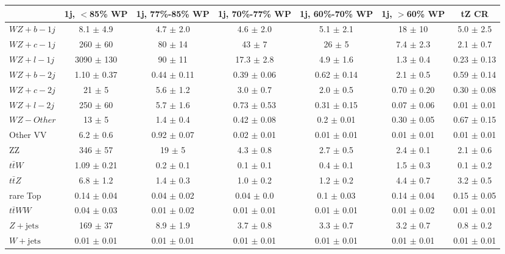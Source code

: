 \begin{tabular}{|l|c|c|c|c|c|c|}
\hline 
 & {1j, $<$85\% WP} & {1j, 77\%-85\% WP} & {1j, 70\%-77\% WP} & {1j, 60\%-70\% WP} & {1j, $>$60\% WP} & {tZ CR}\\
\hline 
  $WZ + b - 1j$   & 8.1 $\pm$ 4.9 & 4.7 $\pm$ 2.0 & 4.6 $\pm$ 2.0 & 5.1 $\pm$ 2.1 & 18 $\pm$ 10 & 5.0 $\pm$ 2.5 \\ 
  $WZ + c - 1j$   & 260 $\pm$ 60 & 80 $\pm$ 14 & 43 $\pm$ 7 & 26 $\pm$ 5 & 7.4 $\pm$ 2.3 & 2.1 $\pm$ 0.7 \\ 
  $WZ + l - 1j$   & 3090 $\pm$ 130 & 90 $\pm$ 11 & 17.3 $\pm$ 2.8 & 4.9 $\pm$ 1.6 & 1.3 $\pm$ 0.4 & 0.23 $\pm$ 0.13 \\ 
  $WZ + b - 2j$   & 1.10 $\pm$ 0.37 & 0.44 $\pm$ 0.11 & 0.39 $\pm$ 0.06 & 0.62 $\pm$ 0.14 & 2.1 $\pm$ 0.5 & 0.59 $\pm$ 0.14 \\
  $WZ + c - 2j$   & 21 $\pm$ 5 & 5.6 $\pm$ 1.2 & 3.0 $\pm$ 0.7 & 2.0 $\pm$ 0.5 & 0.70 $\pm$ 0.20 & 0.30 $\pm$ 0.08\\
  $WZ + l - 2j$   & 250 $\pm$ 60 & 5.7 $\pm$ 1.6 & 0.73 $\pm$ 0.53 & 0.31 $\pm$ 0.15 & 0.07 $\pm$ 0.06 & 0.01 $\pm$ 0.01 \\
  $WZ - Other$   & 13 $\pm$ 5 & 1.4 $\pm$ 0.4 & 0.42 $\pm$ 0.08 & 0.2 $\pm$ 0.01 & 0.30 $\pm$ 0.05 & 0.67 $\pm$ 0.15 \\
  Other VV   & 6.2 $\pm$ 0.6 & 0.92 $\pm$ 0.07 & 0.02 $\pm$ 0.01 & 0.01 $\pm$ 0.01 & 0.01 $\pm$ 0.01 & 0.01 $\pm$ 0.01 \\
  ZZ  & 346 $\pm$ 57 & 19 $\pm$ 5 & 4.3 $\pm$ 0.8 & 2.7 $\pm$ 0.5 & 2.4 $\pm$ 0.1 & 2.1 $\pm$ 0.6 \\ 
  $t\bar{t}W$   & 1.09 $\pm$ 0.21 & 0.2 $\pm$ 0.1 & 0.1 $\pm$ 0.1 & 0.4 $\pm$ 0.1 & 1.5 $\pm$ 0.3 & 0.1 $\pm$ 0.2 \\ 
  $t\bar{t}Z$   & 6.8 $\pm$ 1.2 & 1.4 $\pm$ 0.3 & 1.0 $\pm$ 0.2 & 1.2 $\pm$ 0.2 & 4.4 $\pm$ 0.7 & 3.2 $\pm$ 0.5 \\ 
  rare Top   & 0.14 $\pm$ 0.04 & 0.04 $\pm$ 0.02 & 0.04 $\pm$ 0.0 & 0.1 $\pm$ 0.03 & 0.14 $\pm$ 0.04 & 0.15 $\pm$ 0.05 \\ 
  $t\bar{t}WW$   & 0.04 $\pm$ 0.03 & 0.01 $\pm$ 0.02 & 0.01 $\pm$ 0.01 & 0.01 $\pm$ 0.01 & 0.01 $\pm$ 0.02 & 0.01 $\pm$ 0.01 \\ 
  $Z+\text{jets}$   & 169 $\pm$ 37 & 8.9 $\pm$ 1.9 & 3.7 $\pm$ 0.8 & 3.3 $\pm$ 0.7 & 3.2 $\pm$ 0.7 & 0.8 $\pm$ 0.2 \\ 
  $W+\text{jets}$   & 0.01 $\pm$ 0.01 & 0.01 $\pm$ 0.01 & 0.01 $\pm$ 0.01 & 0.01 $\pm$ 0.01 & 0.01 $\pm$ 0.01 & 0.01 $\pm$ 0.01 \\ 

\end{tabular}
